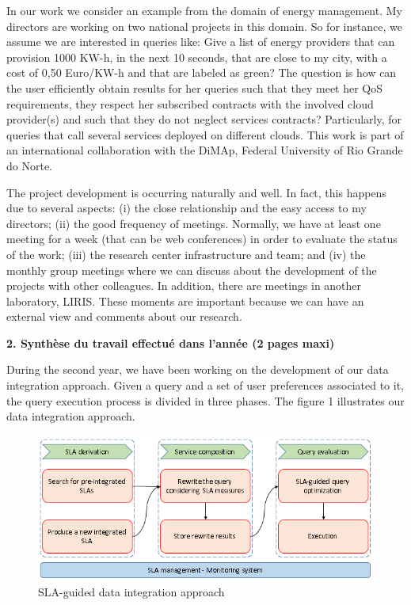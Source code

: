 \documentclass[11pt,a4paper,oneside]{report}
\begin{document}
In our work we consider an example from the domain of energy management. My directors are working on two national projects in this domain. So for instance, we assume we are interested in queries like: Give a list of energy providers that can provision 1000 KW-h, in the next 10 seconds, that are close to my city, with a cost of 0,50 Euro/KW-h and that are labeled as green? The question is how can the user efficiently obtain results for her queries such that they meet her QoS requirements, they respect her subscribed contracts with the involved cloud provider(s) and such that they do not neglect services contracts? Particularly, for queries that call several services deployed on different clouds. This work is part of an international collaboration with the DiMAp, Federal University of Rio Grande do Norte.

The project development is occurring naturally and well. In fact, this happens due to several aspects: (i) the close relationship and the easy access to my directors; (ii) the good frequency of meetings. Normally, we have at least one meeting for a week (that can be web conferences) in order to evaluate the status of the work; (iii) the research center infrastructure and team; and (iv) the monthly group meetings where we can discuss about the development of the projects with other colleagues. In addition, there are meetings in another laboratory, LIRIS. These moments are important because we can have an external view and comments about our research.

\newpage
\begin{flushleft}
\textbf{2. Synthèse du travail effectué dans l’année (2 pages maxi)}\\
\end{flushleft}

During the second year, we have been working on the development of our data integration approach. Given a query and a set of user preferences associated to it, the query execution process is divided in three phases. The figure 1 illustrates our data integration approach.

\begin{figure}[h!]
\center
\includegraphics[scale=0.7]{../../general_approach.PNG} 
\caption{SLA-guided data integration approach}
\end{figure}
\end{document}
